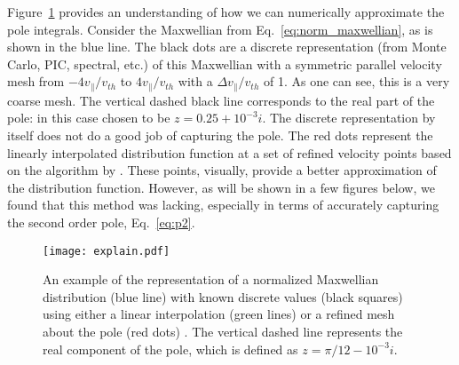 Figure~\ref{f:explainIntegrationMethod} provides an understanding of how we can numerically approximate the pole integrals.
Consider the Maxwellian from Eq.~\ref{eq:norm_maxwellian}, as is shown in the blue line.
The black dots are a discrete representation (from Monte Carlo, PIC, spectral, etc.) of this Maxwellian with a symmetric parallel velocity
mesh from $-4v_\parallel/v_{th}$ to $4v_\parallel/v_{th}$ with a $\Delta v_\parallel/v_{th}$ of 1.
As one can see, this is a very coarse mesh. 
The vertical dashed black line corresponds to the real part of the pole: in this case chosen to be $z=0.25+10^{-3}i$.
The discrete representation by itself does not do a good job of capturing the pole.
The red dots represent the linearly interpolated distribution function at a set of refined velocity points based on the algorithm by \cite{longley2024}.
These points, visually, provide a better approximation of the distribution function.
However, as will be shown in a few figures below, we found that this method was lacking, especially in terms of accurately capturing the second order pole, Eq.~\ref{eq:p2}.


\begin{figure}[!htb]
	\centering
	\texttt{[image: explain.pdf]}
	\caption{An example of the representation of a normalized Maxwellian distribution (blue line) with 
	known discrete values (black squares) using either a linear interpolation (green lines)
	or a refined mesh about the pole (red dots) \citep{longley2024}.
	The vertical dashed line represents the real component of the pole, which is defined as $z=\pi/12-10^{-3}i$.}
	\label{f:explainIntegrationMethod}
\end{figure}


